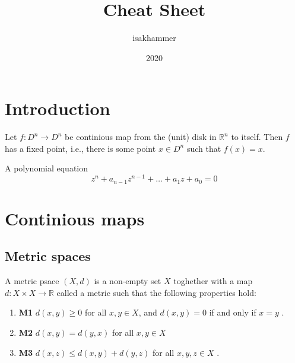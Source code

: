 \documentclass{article}
\title{Cheat Sheet}
\author{isakhammer }
\date{2020}
\theoremstyle{remark}
\begin{document}
\maketitle



\section{ Introduction}%
\label{sec:Ch1}


\begin{theorem}
    Let $f: D^{n} \to D^{n} $ be continious map from the (unit) disk in $\mathbb{R} ^{n}$ to itself. Then $f$ has a
    fixed point, i.e., there is some point $x \in  D^{n}$ such that $f\left( x \right) = x$.
\end{theorem}

\begin{theorem}
    A polynomial equation \[
    z^{n} + a_{n-1}z^{n-1} + \ldots + a_{1}z + a_{0} = 0
    \]
\end{theorem}

\section{ Continious maps}%
\label{sec:continious_maps}

\subsection{Metric spaces}%
\label{sub:metric_spaces}

\begin{definition}
A metric psace $\left( X,d \right)$ is a non-empty set $X$ toghether with a map $d: X \times X  \to \mathbb{R} $ called
a metric such that the following properties hold:
\begin{enumerate}[label=(\roman*)]
    \item \textbf{M1} $d\left( x,y \right) \ge 0$ for all $x,y \in X$, and $d\left( x,y \right) = 0$ if and only if $x =
        y$ .
    \item \textbf{M2} $d\left( x,y \right) = d\left( y,x \right) $  for all $x,y \in  X$
    \item \textbf{M3} $d\left( x,z \right) \le d\left( x,y \right) + d\left( y,z \right)$  for all $x,y,z \in  X$ .
\end{enumerate}
\end{definition}
\end{document}
